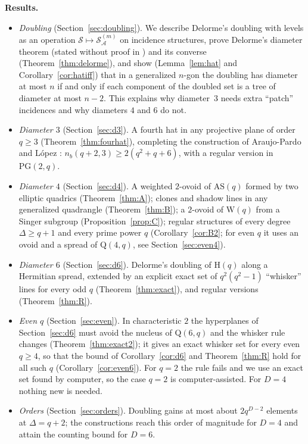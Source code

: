 \documentclass[11pt]{amsart}
\theoremstyle{definition}
\theoremstyle{remark}
\newcommand{\cS}{\mathcal{S}}
\newcommand{\cA}{\mathcal{A}}
\newcommand{\PG}{\mathrm{PG}}
\newcommand{\Hq}{\mathrm{H}}
\newcommand{\AS}{\mathrm{AS}}
\newcommand{\Wq}{\mathrm{W}}
\newcommand{\Qf}{\mathrm{Q}}
\newcommand{\Dbl}[2]{{#1}^{(#2)}_{\cA}}
\begin{document}
\smallskip\noindent\textbf{Results.}
\begin{itemize}[leftmargin=1.5em]
\item \emph{Doubling} (Section~\ref{sec:doubling}). We describe Delorme's doubling with levels \cite[\S7]{D85a} as an operation $\cS\mapsto\Dbl{\cS}{m}$ on incidence structures, prove Delorme's diameter theorem (stated without proof in \cite[\S7]{D85a}) and its converse (Theorem~\ref{thm:delorme}), and show (Lemma~\ref{lem:hat} and Corollary~\ref{cor:hatiff}) that in a generalized $n$-gon the doubling has diameter at most $n$ if and only if each component of the doubled set is a tree of diameter at most $n-2$. This explains why diameter~$3$ needs extra ``patch'' incidences and why diameters $4$ and $6$ do not.
\item \emph{Diameter $3$} (Section~\ref{sec:d3}). A fourth hat in any projective plane of order $q\ge3$ (Theorem~\ref{thm:fourhat}), completing the construction of Araujo-Pardo and L\'opez \cite{AL20}: $n_b(q+2,3)\ge 2(q^2+q+6)$, with a regular version in $\PG(2,q)$.
\item \emph{Diameter $4$} (Section~\ref{sec:d4}). A weighted $2$-ovoid of $\AS(q)$ formed by two elliptic quadrics (Theorem~\ref{thm:A}); clones and shadow lines in any generalized quadrangle (Theorem~\ref{thm:B}); a $2$-ovoid of $\Wq(q)$ from a Singer subgroup (Proposition~\ref{prop:C}); regular structures of every degree $\Delta\ge q+1$ and every prime power $q$ (Corollary~\ref{cor:B2}; for even $q$ it uses an ovoid and a spread of $\Qf(4,q)$, see Section~\ref{sec:even4}).
\item \emph{Diameter $6$} (Section~\ref{sec:d6}). Delorme's doubling of $\Hq(q)$ along a Hermitian spread, extended by an explicit exact set of $q^2(q^2-1)$ ``whisker'' lines for every odd $q$ (Theorem~\ref{thm:exact}), and regular versions (Theorem~\ref{thm:R}).
\item \emph{Even $q$} (Section~\ref{sec:even}). In characteristic $2$ the hyperplanes of Section~\ref{sec:d6} must avoid the nucleus of $\Qf(6,q)$ and the whisker rule changes (Theorem~\ref{thm:exact2}); it gives an exact whisker set for every even $q\ge4$, so that the bound of Corollary~\ref{cor:d6} and Theorem~\ref{thm:R} hold for all such $q$ (Corollary~\ref{cor:even6}). For $q=2$ the rule fails and we use an exact set found by computer, so the case $q=2$ is computer-assisted. For $D=4$ nothing new is needed.
\item \emph{Orders} (Section~\ref{sec:orders}). Doubling gains at most about $2q^{D-2}$ elements at $\Delta=q+2$; the constructions reach this order of magnitude for $D=4$ and attain the counting bound for $D=6$.
\end{itemize}
\end{document}
